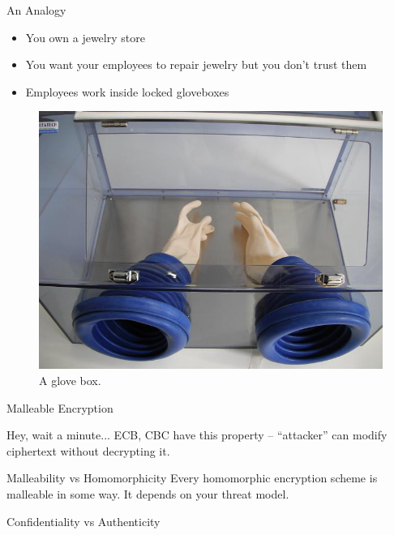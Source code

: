 \documentclass[12pt]{beamer}
\begin{document}
\begin{frame}{An Analogy}
	\begin{itemize}
		\item You own a jewelry store
		\item You want your employees to repair jewelry but you don't trust them
		\item Employees work inside locked gloveboxes
	\end{itemize}
	\begin{figure}[h!]
		\includegraphics[width=\textwidth, height=.4\textheight, keepaspectratio]{./pictures/glovebox}
		\caption{A glove box.}
	\end{figure}
\end{frame}

\begin{frame}{Malleable Encryption}
	\begin{block}{Hey, wait a minute...}
		ECB, CBC have this property -- ``attacker'' can modify ciphertext
		without decrypting it.
	\end{block}
	
	\begin{block}{Malleability vs Homomorphicity}
		Every homomorphic encryption scheme is malleable in some way. It depends
		on your threat model.

		Confidentiality vs Authenticity
	\end{block}
\end{frame}
\end{document}
